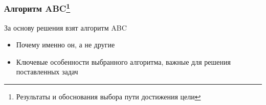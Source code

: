 \documentclass
  [aspectratio=1610] %
  {beamer}
\begin{document}

\begin{frame}
    \frametitle{Алгоритм ABC\footnote{Результаты и обоснования выбора пути достижения цели}}
    За основу решения взят алгоритм ABC
    \begin{itemize}
        \item Почему именно он, а не другие
        \item Ключевые особенности выбранного алгоритма, важные для решения поставленных задач
    \end{itemize}
\end{frame}

\end{document}
